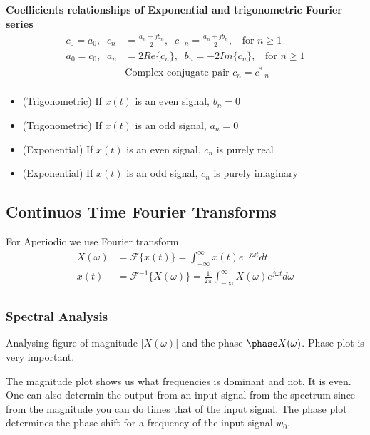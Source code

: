 \documentclass{article}
\begin{document}

\textbf{Coefficients relationships of Exponential and trigonometric Fourier series}
\begin{align*}
    c_0=a_0, \;\; c_n&= \frac{a_n-jb_n}{2}, \;\; c_{-n}=\frac{a_n+jb_n}{2}, \;\; 
    \text{ for } n\geq 1 \\
    a_0=c_0, \;\; a_n&= 2Re\{c_n\}, \;\; b_{n}= -2Im\{c_n\}, \;\; 
    \text{ for } n\geq 1 \\
    &\text{Complex conjugate pair } c_n = c^*_{-n} \\
\end{align*}

\begin{itemize}
    \item (Trigonometric) If $x(t)$ is an even signal, $b_n=0$
    \item (Trigonometric) If $x(t)$ is an odd signal, $a_n=0$
    \item (Exponential) If $x(t)$ is an even signal, $c_n$ is purely real
    \item (Exponential) If $x(t)$ is an odd signal, $c_n$ is purely imaginary
\end{itemize}


\subsection{Continuos Time Fourier Transforms}
For Aperiodic we use Fourier transform
\begin{align*}
    X(\omega) &= \mathcal{F}\{x(t)\} = \int_{-\infty}^{\infty} x(t) e^{-j\omega t} dt \\
    x(t) &= \mathcal{F}^{-1}\{X(\omega)\} = \frac{1}{2\pi} \int_{-\infty}^{\infty} X(\omega) 
    e^{j\omega t} d\omega \\
\end{align*}

\subsubsection{Spectral Analysis}
Analysing figure of magnitude $|X(\omega)|$ and the phase $\phase X(\omega)$.
Phase plot is very important. \newpage

The magnitude plot shows us what frequencies is dominant and not. It is even. 
One can also determin the output from an input signal from the spectrum since from the 
magnitude you can do times that of the input signal. 
The phase plot determines the phase shift for a frequency of the input signal $w_0$.
\end{document}
